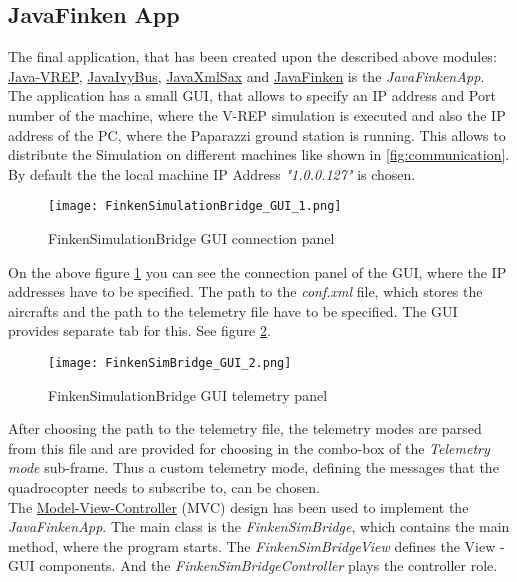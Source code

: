 \subsection{JavaFinken App}
\label{sec:javaFinkenApp}

The final application, that has been created upon the described above modules: \hyperref[sec:vrepImplementation]{Java-VREP}, \hyperref[sec:ivyBusImplementation]{JavaIvyBus}, \hyperref[sec:xmlImplementation]{JavaXmlSax} and \hyperref[sec:javaFinkenImplementation]{JavaFinken}  is the \textit{JavaFinkenApp}. The application has a small \gls{GUI}, that allows to specify an IP address and Port number of the machine, where the V-REP simulation is executed and also the IP address of the PC, where the Paparazzi ground station is running. This allows to distribute the Simulation on different machines like shown in \ref{fig:communication}.
By default the the local machine IP Address \textit{"1.0.0.127"} is chosen. 

\begin{figure}[h!]
 \begin{center}
  \texttt{[image: FinkenSimulationBridge\_GUI\_1.png]}
 \end{center}
  \caption{FinkenSimulationBridge \gls{GUI} connection panel\label{fig:finkenGUI1}}
\end{figure}

On the above figure \ref{fig:finkenGUI1} you can see the connection panel of the \gls{GUI}, where the IP addresses have to be specified. The path to the \textit{conf.xml} file, which stores the aircrafts and the path to the telemetry file have to be specified. The \gls{GUI} provides separate tab for this. See figure \ref{fig:finkenGUI2}.

\begin{figure}[h!]
 \begin{center}
  \texttt{[image: FinkenSimBridge\_GUI\_2.png]}
 \end{center}
  \caption{FinkenSimulationBridge \gls{GUI} telemetry panel\label{fig:finkenGUI2}}
\end{figure}

After choosing the path to the telemetry file, the telemetry modes are parsed from this file and are  provided for choosing in the combo-box of the \textit{Telemetry mode} sub-frame. Thus a custom telemetry mode, defining the messages that the quadrocopter needs to subscribe to, can be chosen. \\

The \href{http://www.oracle.com/technetwork/articles/javase/index-142890.html}{Model-View-Controller} (MVC) design has been used to implement the \textit{JavaFinkenApp}. The main class is the \textit{FinkenSimBridge}, which contains the main method, where the program starts. The \textit{FinkenSimBridgeView} defines the View - \gls{GUI} components. And the \textit{FinkenSimBridgeController} plays the controller role. \\

